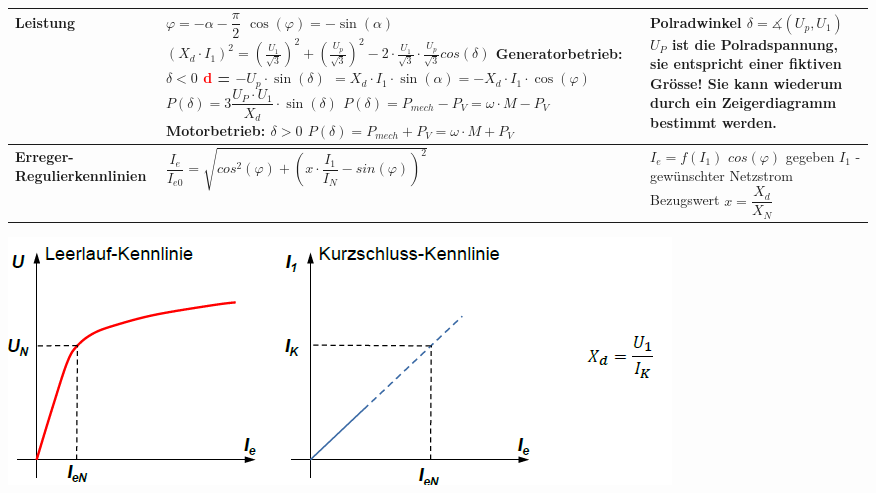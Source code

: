 \begin{tabular}[b]{| C{5cm}| P{8.5cm} | P{5 cm} |}
        \textbf{Leistung} \newline
         &
        $\varphi = -\alpha - \dfrac{\pi}{2}$ \newline
        $\cos(\varphi) = -\sin(\alpha)$ \newline
       	$ (X_d \cdot I_1)^2=(\frac{U_1}{\sqrt{3}})^2+(\frac{U_p}{\sqrt{3}})^2 - 2\cdot \frac{U_1}{\sqrt{3}}\cdot \frac{U_p}{\sqrt{3}} cos(\delta) $ \newline\newline
        \textbf{Generatorbetrieb:} $\delta < 0$ \newline
        \textcolor{red}{d} = $-U_p\cdot\sin(\delta)$ \newline
        \qquad $= X_d\cdot I_1\cdot\sin(\alpha) = -X_d\cdot I_1\cdot\cos(\varphi)$ \newline \newline
        $P(\delta) = 3\dfrac{U_P\cdot U_1}{X_d}\cdot\sin(\delta)$ \newline \newline
        $P(\delta) = P_{mech}-P_V = \omega\cdot M - P_V$ \newline \newline
        \textbf{Motorbetrieb:} $\delta > 0$ \newline
        $P(\delta) = P_{mech} + P_V = \omega\cdot M + P_V$ &
        Polradwinkel $\delta =  \measuredangle (U_p, U_1)$  \newline \newline
        $U_P$ ist die Polradspannung, sie entspricht einer fiktiven Grösse! Sie kann wiederum durch ein Zeigerdiagramm bestimmt werden.
        \\ \hline
		\textbf{Erreger-Regulierkennlinien} & 
		$ \dfrac{I_e}{I_{e0}} = \sqrt{cos^2(\varphi) + \left(x\cdot\dfrac{I_1}{I_N}-sin(\varphi)\right)^2}$ & $I_e = f(I_1)$ \newline $cos(\varphi)$ gegeben \newline $I_1$ - gewünschter Netzstrom \newline Bezugswert $x = \dfrac{X_d}{X_N}$
		\\ \hline
	    \end{tabular}
    \clearpage
    \newpage
    
    \includegraphics[scale = 0.8]{images/KennlinieSynchronmaschine}

